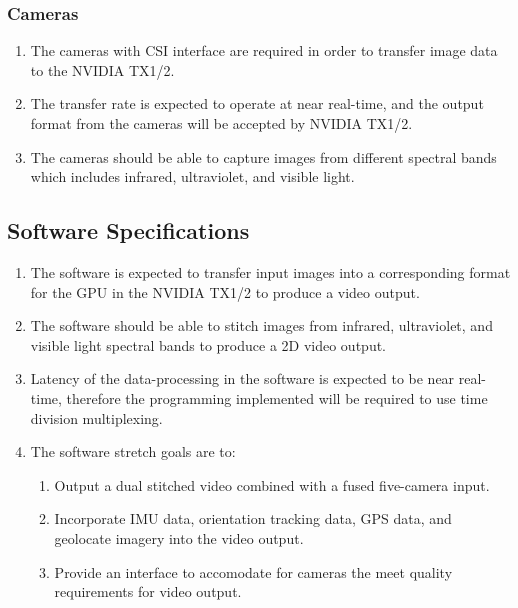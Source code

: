 \documentclass[letterpaper,10pt,serif,draftclsnofoot,onecolumn,compsoc,titlepage]{IEEEtran}
\begin{document}
\subsubsection{Cameras}

\begin{enumerate}[label=\alph*]
	\item The cameras with CSI interface are required in order to transfer image data to 
	the NVIDIA TX1/2.\\
	\item The transfer rate is expected to operate at near real-time, and the output format 
	from the cameras will be accepted by NVIDIA TX1/2.\\
	\item The cameras should be able to capture images from different spectral bands 
	which includes infrared, ultraviolet, and visible light.\\
\end{enumerate}

\subsection{Software Specifications}

\begin{enumerate}[label=\alph*]
	\item The software is expected to transfer input images into a corresponding format for 
	the GPU in the NVIDIA TX1/2 to produce a video output.\\
	\item The software should be able to stitch images from infrared, ultraviolet, 
	and visible light spectral bands to produce a 2D video output. \\
	\item Latency of the data-processing in the software is expected to be near 
	real-time, therefore the programming implemented will be required to use time
	division multiplexing. \\
	\item The software stretch goals are to:
	\begin{enumerate}
	 	\item Output a dual stitched video combined with a fused five-camera input.\\
		\item Incorporate IMU data, orientation tracking data, GPS data, and geolocate 
		imagery into the video output.\\
		\item Provide an interface to accomodate for cameras the meet quality
		requirements for video output. \\
	\end{enumerate} 
\end{enumerate}
\end{document}
